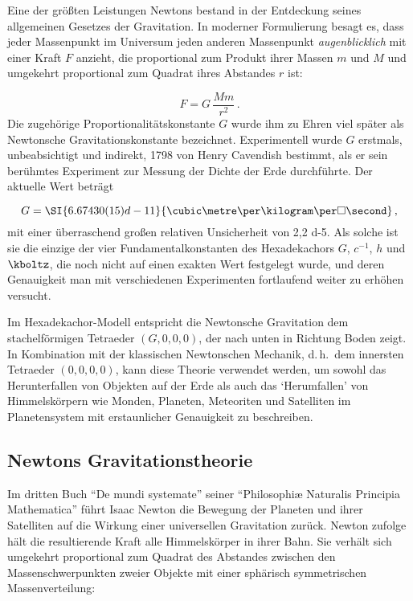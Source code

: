 
\newpage
{}
\label{sec:1000}

Eine der größten Leistungen Newtons bestand in der Entdeckung seines allgemeinen Gesetzes der Gravitation. In moderner Formulierung besagt es, dass jeder Massenpunkt im Universum jeden anderen Massenpunkt \emph{augenblicklich} mit einer Kraft $F$ anzieht, die proportional zum Produkt ihrer Massen $m$ und $M$ und umgekehrt proportional zum Quadrat ihres Abstandes $r$ ist:

\begin{equation*}\label{eq:gravitation}
  F=G\,\frac{Mm}{r^2}\,.
\end{equation*}
%
Die zugehörige Proportionalitätskonstante $G$ wurde ihm zu Ehren viel später als Newtonsche Gravitationskonstante bezeichnet. Experimentell wurde $G$ erstmals, unbeabsichtigt und indirekt, 1798 von Henry Cavendish bestimmt, als er sein berühmtes Experiment zur Messung der Dichte der Erde durchführte. Der aktuelle Wert beträgt

\begin{equation*}
  G = \SI{6.67430(15)d-11}{\cubic\metre\per\kilogram\per\square\second}\,,
\end{equation*}
%
mit einer überraschend großen relativen Unsicherheit von \num{2,2 d-5}. Als solche ist sie die einzige der vier Fundamentalkonstanten des Hexadekachors $G$, $c^{-1}$, $h$ und $\kboltz$, die noch nicht auf einen exakten Wert festgelegt wurde, und deren Genauigkeit man mit verschiedenen Experimenten fortlaufend weiter zu erhöhen versucht.

Im Hexadekachor-Modell entspricht die Newtonsche Gravitation dem stachelförmigen Tetraeder $(G,0,0,0)$, der nach unten in Richtung Boden zeigt. In Kombination mit der klassischen Newtonschen Mechanik, d.\,h.\ dem innersten Tetraeder $(0,0,0,0)$, kann diese Theorie verwendet werden, um sowohl das Herunterfallen von Objekten auf der Erde als auch das \enquote*{Herumfallen} von Himmelskörpern wie Monden, Planeten, Meteoriten und Satelliten im Planetensystem mit erstaunlicher Genauigkeit zu beschreiben.


\subsection*{Newtons Gravitationstheorie}

Im dritten Buch \enquote{De mundi systemate} seiner \enquote{Philosophiæ Naturalis Principia Mathematica} führt Isaac Newton die Bewegung der Planeten und ihrer Satelliten auf die Wirkung einer universellen Gravitation zurück. Newton zufolge hält die resultierende Kraft alle Himmelskörper in ihrer Bahn. Sie verhält sich umgekehrt proportional zum Quadrat des Abstandes zwischen den Massenschwerpunkten zweier Objekte mit einer sphärisch symmetrischen Massenverteilung:

